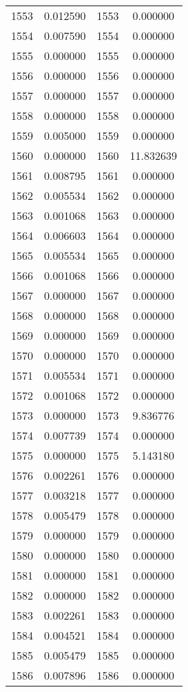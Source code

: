 \documentclass[12pt]{article}
\begin{document}
\begin{longtable}{@{}cccc@{}}
1553 & 0.012590 & 1553 & 0.000000 \\
1554 & 0.007590 & 1554 & 0.000000 \\
1555 & 0.000000 & 1555 & 0.000000 \\
1556 & 0.000000 & 1556 & 0.000000 \\
1557 & 0.000000 & 1557 & 0.000000 \\
1558 & 0.000000 & 1558 & 0.000000 \\
1559 & 0.005000 & 1559 & 0.000000 \\
1560 & 0.000000 & 1560 & 11.832639 \\
1561 & 0.008795 & 1561 & 0.000000 \\
1562 & 0.005534 & 1562 & 0.000000 \\
1563 & 0.001068 & 1563 & 0.000000 \\
1564 & 0.006603 & 1564 & 0.000000 \\
1565 & 0.005534 & 1565 & 0.000000 \\
1566 & 0.001068 & 1566 & 0.000000 \\
1567 & 0.000000 & 1567 & 0.000000 \\
1568 & 0.000000 & 1568 & 0.000000 \\
1569 & 0.000000 & 1569 & 0.000000 \\
1570 & 0.000000 & 1570 & 0.000000 \\
1571 & 0.005534 & 1571 & 0.000000 \\
1572 & 0.001068 & 1572 & 0.000000 \\
1573 & 0.000000 & 1573 & 9.836776 \\
1574 & 0.007739 & 1574 & 0.000000 \\
1575 & 0.000000 & 1575 & 5.143180 \\
1576 & 0.002261 & 1576 & 0.000000 \\
1577 & 0.003218 & 1577 & 0.000000 \\
1578 & 0.005479 & 1578 & 0.000000 \\
1579 & 0.000000 & 1579 & 0.000000 \\
1580 & 0.000000 & 1580 & 0.000000 \\
1581 & 0.000000 & 1581 & 0.000000 \\
1582 & 0.000000 & 1582 & 0.000000 \\
1583 & 0.002261 & 1583 & 0.000000 \\
1584 & 0.004521 & 1584 & 0.000000 \\
1585 & 0.005479 & 1585 & 0.000000 \\
1586 & 0.007896 & 1586 & 0.000000 \\

\end{longtable}
\end{document}
